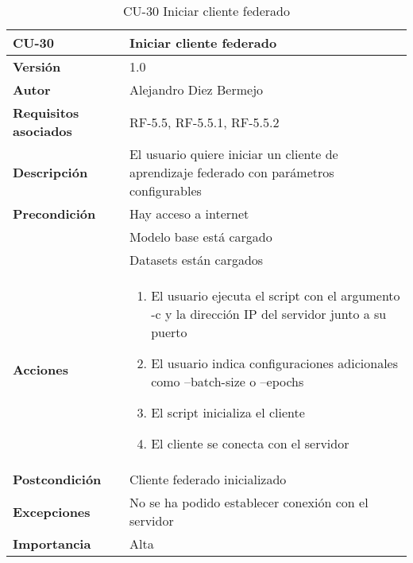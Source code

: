 \begin{table}[p]
	\centering
	\begin{tabularx}{\linewidth}{ p{} p{} }
		\toprule
		\textbf{CU-30}    & \textbf{Iniciar cliente federado}\\
		\toprule
		\textbf{Versión}              & 1.0    \\
		\textbf{Autor}                & Alejandro Diez Bermejo \\
		\textbf{Requisitos asociados} & RF-5.5, RF-5.5.1, RF-5.5.2 \\
		\textbf{Descripción}          & El usuario quiere iniciar un cliente de aprendizaje federado con parámetros configurables \\
        \textbf{Precondición}         & Hay acceso a internet \\
                                      & Modelo base está cargado \\
                                      & Datasets están cargados \\
		\textbf{Acciones}             &
		\begin{enumerate}
			\def\labelenumi{\arabic{enumi}.}
			\tightlist
            \item El usuario ejecuta el script con el argumento -c y la dirección IP del servidor junto a su puerto
            \item El usuario indica configuraciones adicionales como --batch-size o --epochs
            \item El script inicializa el cliente
            \item El cliente se conecta con el servidor
		\end{enumerate}\\
		\textbf{Postcondición}        & Cliente federado inicializado \\
		\textbf{Excepciones}          & No se ha podido establecer conexión con el servidor\\
		\textbf{Importancia}          & Alta \\
		\bottomrule
	\end{tabularx}
	\caption{CU-30 Iniciar cliente federado}
\end{table}

